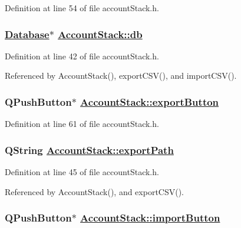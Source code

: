 Definition at line 54 of file account\-Stack.h.\hypertarget{classAccountStack_r0}{
\subsubsection[db]{\setlength{\rightskip}{0pt plus 5cm}\hyperlink{classDatabase}{Database}$\ast$ \hyperlink{classAccountStack_r0}{Account\-Stack::db}}}
\label{classAccountStack_r0}


Definition at line 42 of file account\-Stack.h.

Referenced by Account\-Stack(), export\-CSV(), and import\-CSV().\hypertarget{classAccountStack_r15}{
\subsubsection[exportButton]{\setlength{\rightskip}{0pt plus 5cm}QPush\-Button$\ast$ \hyperlink{classAccountStack_r15}{Account\-Stack::export\-Button}}}
\label{classAccountStack_r15}


Definition at line 61 of file account\-Stack.h.\hypertarget{classAccountStack_r2}{
\subsubsection[exportPath]{\setlength{\rightskip}{0pt plus 5cm}QString \hyperlink{classAccountStack_r2}{Account\-Stack::export\-Path}}}
\label{classAccountStack_r2}


Definition at line 45 of file account\-Stack.h.

Referenced by Account\-Stack(), and export\-CSV().\hypertarget{classAccountStack_r14}{
\subsubsection[importButton]{\setlength{\rightskip}{0pt plus 5cm}QPush\-Button$\ast$ \hyperlink{classAccountStack_r14}{Account\-Stack::import\-Button}}}
\label{classAccountStack_r14}


